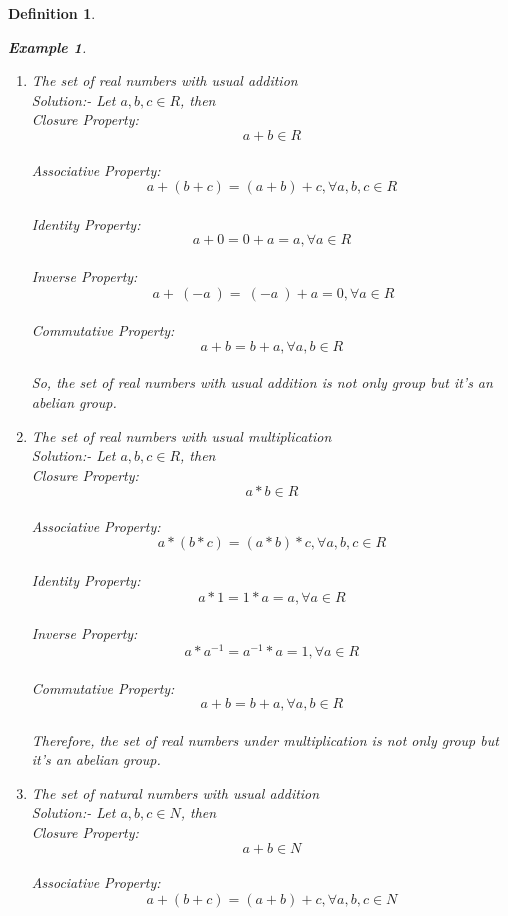 \documentclass{article}
\newtheorem{defn}{Definition} [section]
\newtheorem{ex}{Example}[section]
\begin{document}
\begin{defn}
\begin{ex}
\begin{enumerate}
	\\Closure Property: $$a*b \in Z$$
	\\Associative Property: $$a*(b*c)=(a*b)*c, \forall a,b,c \in Z$$
	\\Identity Property: $$a*1=1*a=a, \forall a \in Z$$
	\\Inverse Property: $$a*a^{-1}= a^{-1} * a = 1 , \forall a \in Z$$
	\\It doesn't holds because except for 1, inverse of every number is not integer it's in fraction.
	\\Therefore, the set of integers under multiplication is not a group.\\
	\item The set of real numbers with usual addition
	\\Solution:- Let $a,b,c \in R$, then 
	\\Closure Property: $$a+b \in R$$
	\\Associative Property: $$a+(b+c)=(a+b)+c, \forall a,b,c \in R$$
	\\Identity Property: $$a+0=0+a=a, \forall a \in R$$
	\\Inverse Property: $$ \ a + \ (-a\ ) =\ (-a\ ) + a = 0 , \forall a \in R$$
	\\Commutative Property: $$a+b=b+a,\forall a,b \in R$$
	\\So, the set of real numbers with usual addition is not only group but it's an abelian group.\\
	\item The set of real numbers with usual multiplication
	\\Solution:- Let $a,b,c \in R$, then 
	\\Closure Property: $$a*b \in R$$
	\\Associative Property: $$a*(b*c)=(a*b)*c, \forall a,b,c \in R$$
	\\Identity Property: $$a*1=1*a=a, \forall a \in R$$
	\\Inverse Property: $$a*a^{-1}= a^{-1} * a = 1 , \forall a \in R$$
	\\Commutative Property: $$a+b=b+a,\forall a,b \in R$$
	\\Therefore, the set of real numbers under multiplication is not only group but it's an abelian group.\\
	\item The set of natural numbers with usual addition
	\\Solution:- Let $a,b,c \in N$, then 
	\\Closure Property: $$a+b \in N$$
	\\Associative Property: $$a+(b+c)=(a+b)+c, \forall a,b,c \in N$$

\end{enumerate}
\end{ex}
\end{defn}
\end{document}
